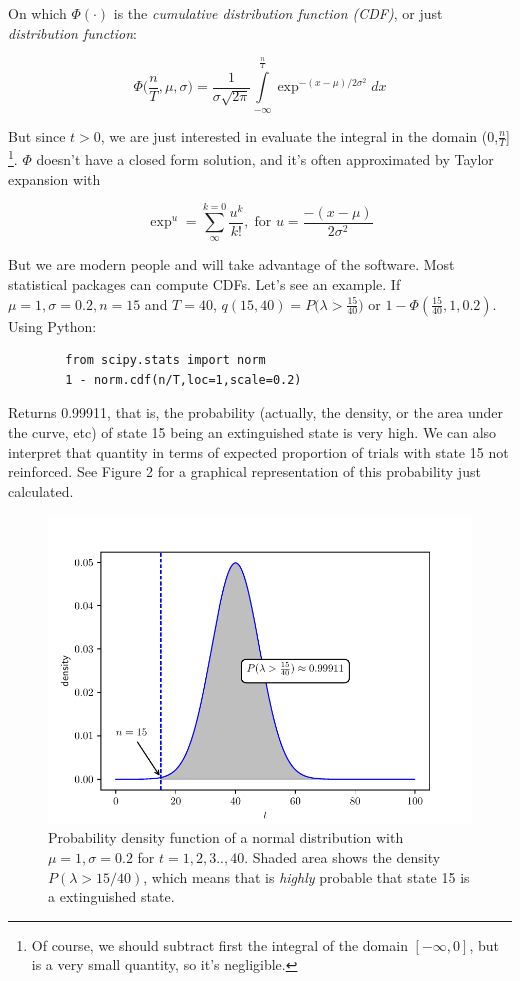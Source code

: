 \documentclass[11pt]{article}
\begin{document}
On which $\Phi (\cdot)$ is the \textit{cumulative distribution function (CDF)}, or just \textit{distribution function}:

    \[
        \Phi \Big( \frac{n}{T}, \mu, \sigma \Big) = \frac{1}{\sigma \sqrt{2 \pi}} \int\limits_{-\infty}^{\frac{n}{T}} \exp^{-(x - \mu)/2\sigma^2}dx
    \]

But since $t > 0$, we are just interested in evaluate the integral in the domain (0,$\frac{n}{T}$] \footnote{Of course,
    we should subtract first the integral of the domain $[-\infty, 0]$, but is a very small quantity, so it's negligible.}.
$\Phi$ doesn't have a closed form solution, and it's often approximated by Taylor expansion with

    \[
        \exp^{u} = \sum^{k=0}_{\infty} \frac{u^k}{k!}, \; \text{for } u = \frac{-(x - \mu)}{2 \sigma^2}
    \]

But we are modern people and will take advantage of the software.
Most statistical packages can compute CDFs.
Let's see an example.
If $\mu = 1, \sigma = 0.2, n = 15$
and $T = 40$, $q(15,40) = P \Big( \lambda > \frac{15}{40} \Big)$ or $1 - \Phi(\frac{15}{40},1,0.2)$. Using \textsf{Python}:

    \begin{verbatim}
        from scipy.stats import norm
        1 - norm.cdf(n/T,loc=1,scale=0.2)
    \end{verbatim}

Returns 0.99911, that is, the probability (actually, the density, or the area under the curve, etc) of state 15 being an
    extinguished state is very high.
    We can also interpret that quantity in terms of expected proportion of trials with state 15 not reinforced.
    See Figure 2 for a graphical representation of this probability just calculated.

    \begin{figure}[H]
        \centering
        \includegraphics[scale=0.65]{lambda_nT}
        \caption{Probability density function of a normal distribution with $\mu = 1, \sigma = 0.2$ for $t = 1,2,3..,40$.
        Shaded area shows the density $P(\lambda > 15/40)$, which means that is \textit{highly} probable that state 15
        is a extinguished state.}
    \end{figure}
\end{document}
